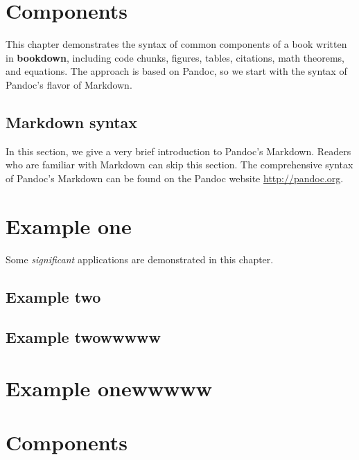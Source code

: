 \documentclass[]{krantz}
\begin{document}
\hypertarget{components}{%
\chapter{Components}\label{components}}

This chapter demonstrates the syntax of common components of a book written in \textbf{bookdown}, including code chunks, figures, tables, citations, math theorems, and equations. The approach is based on Pandoc, so we start with the syntax of Pandoc's flavor of Markdown.

\hypertarget{markdown-syntax}{%
\section{Markdown syntax}\label{markdown-syntax}}

In this section, we give a very brief introduction to Pandoc's Markdown. Readers who are familiar with Markdown can skip this section. The comprehensive syntax of Pandoc's Markdown can be found on the Pandoc website \url{http://pandoc.org}.

\hypertarget{appendix-apendice}{%
\appendix {}}


\hypertarget{example-one-1}{%
\chapter{Example one}\label{example-one-1}}

Some \emph{significant} applications are demonstrated in this chapter.

\hypertarget{example-two-1}{%
\section{Example two}\label{example-two-1}}

\hypertarget{example-twowwwww-1}{%
\section{Example twowwwww}\label{example-twowwwww-1}}

\hypertarget{example-onewwwww-1}{%
\chapter{Example onewwwww}\label{example-onewwwww-1}}

\hypertarget{components-1}{%
\chapter{Components}\label{components-1}}
\end{document}

